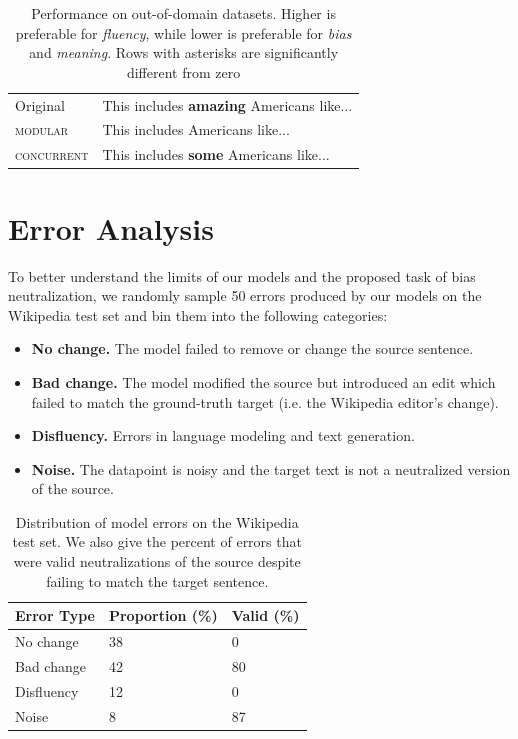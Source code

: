 \begin{table}[]
\begin{tabular}{llll}
\multicolumn{1}{l|}{Original} & \multicolumn{3}{l}{\small This includes \textbf{amazing} Americans like...} \\
\multicolumn{1}{l|}{\textsc{modular}} & \multicolumn{3}{l}{\small This includes Americans like...} \\
\multicolumn{1}{l|}{\textsc{concurrent}} & \multicolumn{3}{l}{\small This includes \textbf{some} Americans like...} 
\end{tabular}
\caption{Performance on out-of-domain datasets. Higher is preferable for \emph{fluency}, while lower is preferable for \emph{bias} and \emph{meaning}. Rows with asterisks are significantly different from zero}
\label{tab:other-results}
\end{table}


\section{Error Analysis}
To better understand the limits of our models and the proposed task of bias neutralization, we randomly sample 50 errors produced by our models on the Wikipedia test set and bin them into the following categories:




\begin{itemize}
    \item \textbf{No change.} The model failed to remove or change the source sentence.
    \item \textbf{Bad change.} The model modified the source but introduced an edit which failed to match the ground-truth target (i.e. the Wikipedia editor's change).
    \item \textbf{Disfluency.} Errors in language modeling and text generation.
    \item \textbf{Noise.} The datapoint is noisy and the target text is not a neutralized version of the source.
\end{itemize}


\begin{table}[h!]
\centering
\begin{tabular}{l|ll}
\textbf{Error Type} & \textbf{Proportion (\%)} & \textbf{Valid (\%)} \\ \hline \hline
No change  & 38                & 0            \\
Bad change & 42                & 80           \\
Disfluency & 12                & 0            \\
Noise      & 8                 & 87         
\end{tabular}
\caption{Distribution of model errors on the Wikipedia test set. We also give the percent of errors that were valid neutralizations of the source despite failing to match the target sentence.}
\label{tab:error-prop}
\end{table}

